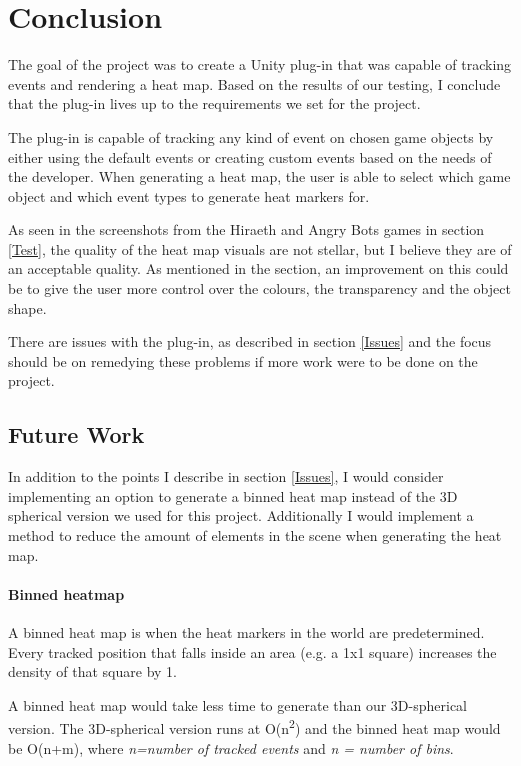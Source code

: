 \section{Conclusion}
The goal of the project was to create a Unity plug-in that was capable of tracking events and rendering a heat map. Based on the results of our testing, I conclude that the plug-in lives up to the requirements we set for the project.

The plug-in is capable of tracking any kind of event on chosen game objects by either using the default events or creating custom events based on the needs of the developer. When generating a heat map, the user is able to select which game object and which event types to generate heat markers for.

As seen in the screenshots from the Hiraeth and Angry Bots games in section \ref{Test}, the quality of the heat map visuals are not stellar, but I believe they are of an acceptable quality. As mentioned in the  section, an improvement on this could be to give the user more control over the colours, the transparency and the object shape. 

There are issues with the plug-in, as described in section \ref{Issues} and the focus should be on remedying these problems if more work were to be done on the project. 

\subsection{Future Work}
In addition to the points I describe in section \ref{Issues}, I would consider implementing an option to generate a binned heat map instead of the 3D spherical version we used for this project.  Additionally I would implement a method to reduce the amount of elements in the scene when generating the heat map.
\paragraph{Binned heatmap}
A binned heat map is when the heat markers in the world are predetermined. Every tracked position that falls inside an area (e.g. a 1x1 square) increases the density of that square by 1. 

A binned heat map would take less time to generate than our 3D-spherical version. The 3D-spherical version runs at O(n\textsuperscript{2}) and the binned heat map would be O(n+m), where \textit{n=number of tracked events} and \textit{n = number of bins}. 

